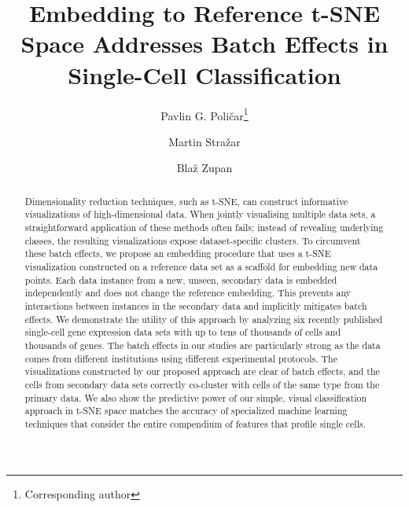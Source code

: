 \documentclass[runningheads]{llncs}
\begin{document}
%
\title{Embedding to Reference t-SNE Space Addresses Batch Effects in Single-Cell Classification}
%
%
\author{Pavlin G. Poli\v{c}ar\thanks{Corresponding author} \and
Martin Stra\v{z}ar \and
Bla\v{z} Zupan}
%
%

\maketitle

\begin{abstract}

Dimensionality reduction techniques, such as t-SNE, can construct informative
visualizations of high-dimensional data. When jointly visualising multiple data
sets, a straightforward application of these methods often fails; instead of
revealing underlying classes, the resulting visualizations expose
dataset-specific clusters. To circumvent these batch effects, we propose an
embedding procedure that uses a t-SNE visualization constructed on a reference
data set as a scaffold for embedding new data points. Each data instance from a
new, unseen, secondary data is embedded independently and does not change the
reference embedding. This prevents any interactions between instances in the
secondary data and implicitly mitigates batch effects. We demonstrate the
utility of this approach by analyzing six recently published single-cell gene
expression data sets with up to tens of thousands of cells and thousands of
genes. The batch effects in our studies are particularly strong as the data
comes from different institutions using different experimental protocols. The
visualizations constructed by our proposed approach are clear of batch effects,
and the cells from secondary data sets correctly co-cluster with cells of the
same type from the primary data. We also show the predictive power of our
simple, visual classification approach in t-SNE space matches the accuracy of
specialized machine learning techniques that consider the entire compendium of
features that profile single cells.

\end{abstract}
\end{document}
